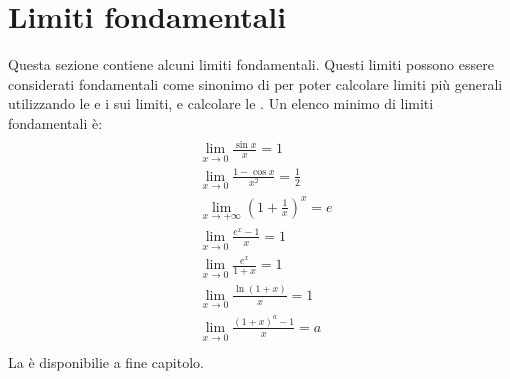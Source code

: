 \documentclass[letterpaper,10pt,italian]{jupyterBook}
\begin{document}
\section{Limiti fondamentali}
\label{\detokenize{ch/infinitesimal_calculus/analysis:limiti-fondamentali}}\label{\detokenize{ch/infinitesimal_calculus/analysis:infinitesimal-calculus-limits-fund}}
\sphinxAtStartPar
Questa sezione contiene alcuni limiti fondamentali. Questi limiti possono essere considerati fondamentali come sinonimo di  per poter calcolare limiti più generali utilizzando le {\hyperref[\detokenize{ch/infinitesimal_calculus/analysis:infinitesimal-calculus-limits-thms-operations}]{}} e i {\hyperref[\detokenize{ch/infinitesimal_calculus/analysis:infinitesimal-calculus-limits-thms}]{}} sui limiti, e calcolare le {\hyperref[\detokenize{ch/infinitesimal_calculus/derivatives:infinitesimal-calculus-derivatives-fund}]{}}. Un elenco minimo di limiti fondamentali è:
\begin{equation*}
\begin{split}\begin{aligned}
 & \lim_{x \rightarrow 0} \frac{\sin x}{x} = 1                       \\ 
 & \lim_{x \rightarrow 0} \frac{1 - \cos x}{x^2} = \frac{1}{2}       \\ 
 & \lim_{x \rightarrow +\infty} \left( 1 + \frac{1}{x} \right)^x = e \\ 
 & \lim_{x \rightarrow 0} \frac{e^x - 1}{x}= 1                       \\ 
 & \lim_{x \rightarrow 0} \frac{e^x}{1+x}= 1                         \\ 
 & \lim_{x \rightarrow 0} \frac{\ln (1+x)}{x} = 1                    \\ 
 & \lim_{x \rightarrow 0} \frac{(1+x)^a - 1}{x} = a                  \\ 
\end{aligned}\end{split}
\end{equation*}
\sphinxAtStartPar
La {\hyperref[\detokenize{ch/infinitesimal_calculus/analysis-notes:infinitesimal-calculus-limits-fund-notes}]{}} è disponibilie a fine capitolo.
\end{document}
